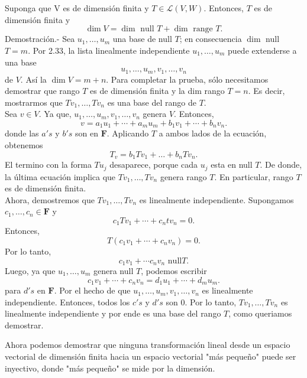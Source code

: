 \setcounter{myteo}{21}
\begin{myteo}\,\\\\
	Suponga que V es de dimensión finita y $T\in \mathcal{L}(V,W)$. Entonces, $T$ es de dimensión finita y 
	$$\dim V = \dim \mbox{ null } T + \dim \mbox{ range }T.$$
	    Demostración.-\; Sea $u_1,\ldots,u_m$ una base de null $T$; en consecuencia $\dim$ null $T=m$. Por 2.33, la lista linealmente independiente $u_1,\ldots,u_m$ puede extenderse a una base
	    $$u_1,\ldots,u_m,v_1,\ldots,v_n$$
	    de $V$. Así la $\dim V=m+n$. Para completar la prueba, sólo necesitamos demostrar que rango $T$ es de dimensión finita y la dim rango $T=n$. Es decir, mostrarmos que  $Tv_1,\ldots,Tv_n$ es una base del rango de $T$.\\

	    Sea $v\in V$. Ya que, $u_1,\ldots,u_m,v_1,\ldots,v_n$ genera $V$. Entonces,
	    $$v=a_1u_1+\cdots+a_mu_m+b_1v_1+\cdots+b_nv_n.$$
	    donde las $a's$ y $b's$ son en $\textbf{F}$. Aplicando $T$ a ambos lados de la ecuación, obtenemos
	    $$T_v=b_1Tv_1+\ldots+b_nTv_n.$$
	    El termino con la forma $Tu_j$ desaparece, porque cada $u_j$ esta en null $T$. De donde, la última ecuación implica que $Tv_1,\ldots,Tv_n$ genera rango $T$. En particular, rango $T$ es de dimensión finita.\\

	    Ahora, demostremos que $Tv_1,\ldots,Tv_n$ es linealmente independiente. Supongamos $c_1,\ldots,c_n\in \textbf{F}$ y 
	    $$c_1Tv_1+\cdots+c_ntv_n=0.$$
	    Entonces,
	    $$T\left(c_1v_1+\cdots +c_nv_n\right)=0.$$
	    Por lo tanto,
	    $$c_1v_1+\cdots c_nv_n \mbox{ null} T.$$
	    Luego, ya que $u_1,\ldots,u_m$ genera null $T$, podemos escribir
	    $$c_1v_1+\cdots + c_nv_n = d_1u_1+\cdots + d_mu_m.$$
	    para $d's$ en $\textbf{F}$. Por el hecho de que $u_1,\ldots,u_m,v_1,\ldots,v_n$ es linealmente independiente. Entonces,  todos los $c's$ y $d's$ son $0$. Por lo tanto, $Tv_1,\ldots,Tv_n$ es linealmente independiente y por ende es una base del rango $T$, como queriamos demostrar.

\end{myteo}

Ahora podemos demostrar que ninguna transformación lineal desde un espacio vectorial de dimensión finita hacia un espacio vectorial "más pequeño" puede ser inyectivo, donde "más pequeño" se mide por la dimensión.

